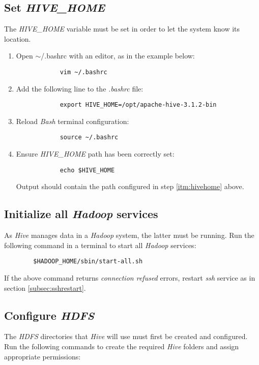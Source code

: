 \documentclass{article}
\begin{document}
    \subsection{Set \emph{HIVE\_HOME}}
    The \emph{HIVE\_HOME} variable must be set in order to let the system know its location.
    \begin{enumerate}
        \item Open $\sim$/.bashrc with an editor, as in the example below:
        \begin{verbatim}
            vim ~/.bashrc
        \end{verbatim}

        \item Add the following line to the \emph{.bashrc} file:
        \label{itm:hivehome}
        \begin{verbatim}
            export HIVE_HOME=/opt/apache-hive-3.1.2-bin
        \end{verbatim}

        \item Reload \emph{Bash} terminal configuration:
        \begin{verbatim}
            source ~/.bashrc
        \end{verbatim}
        
        \item Ensure \emph{HIVE\_HOME} path has been correctly set:
        \begin{verbatim}
            echo $HIVE_HOME
        \end{verbatim}
        Output should contain the path configured in step \ref{itm:hivehome} above.
    \end{enumerate}

    \subsection{Initialize all \emph{Hadoop} services}
    \label{subsec:hadoopall}
    As \emph{Hive} manages data in a \emph{Hadoop} system, the latter must be running.
    Run the following command in a terminal to start all \emph{Hadoop} services:
    \begin{verbatim}
        $HADOOP_HOME/sbin/start-all.sh
    \end{verbatim}
    If the above command returns \emph{connection refused} errors, restart \emph{ssh} service as
    in section \ref{subsec:sshrestart}.

    \subsection{Configure \emph{HDFS}}
    The \emph{HDFS} directories that \emph{Hive} will use must first be created and configured.
    Run the following commands to create the required \emph{Hive} folders and assign appropriate
    permissions:
\end{document}
